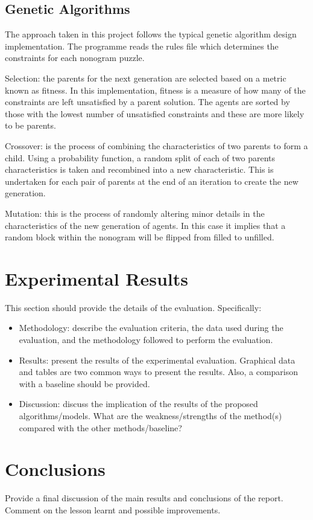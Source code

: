 \documentclass{svproc}
\begin{document}
\subsection{Genetic Algorithms}
The approach taken in this project follows the typical genetic algorithm design implementation. The programme reads the rules file which determines the constraints for each nonogram puzzle. 

Selection: the parents for the next generation are selected based on a metric known as fitness. In this implementation, fitness is a measure of how many of the constraints are left unsatisfied by a parent solution. The agents are sorted by those with the lowest number of unsatisfied constraints and these are more likely to be parents.

Crossover: is the process of combining the characteristics of two parents to form a child. Using a probability function, a random split of each of two parents characteristics is taken and recombined into a new characteristic. This is undertaken for each pair of parents at the end of an iteration to create the new generation.

Mutation: this is the process of randomly altering minor details in the characteristics of the new generation of agents. In this case it implies that a random block within the nonogram will be flipped from filled to unfilled.

\section{Experimental Results}
	This section should provide the details of the evaluation. Specifically:
\begin{itemize}
	\item Methodology: describe the evaluation criteria, the data used during the evaluation, and the methodology followed to perform the evaluation.
	\item Results: present the results of the experimental evaluation. Graphical data and tables are two common ways to present the results. Also, a comparison with a baseline should be provided.
	\item Discussion: discuss the implication of the results of the proposed algorithms/models. What are the weakness/strengths of the method(s) compared with the other methods/baseline?
\end{itemize}


\section{Conclusions}
Provide a final discussion of the main results and conclusions of the report. Comment on the lesson learnt and possible improvements.
\end{document}
